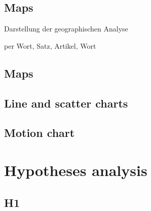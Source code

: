 \subsection{Maps}

\begin{todos}
    \item Darstellung der geographischen Analyse
    \item per Wort, Satz, Artikel, Wort
\end{todos}

\subsection{Maps}

%

\subsection{Line and scatter charts}


\subsection{Motion chart}


\section{Hypotheses analysis}


\subsection*{H1}

